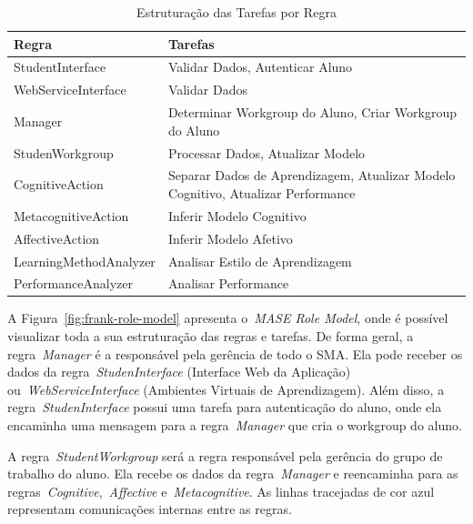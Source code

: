 \begin{table}
	\caption{Estruturação das Tarefas por Regra}
	\begin{tabular}{|p{5cm} | p{9cm}|}
		\hline
		\textbf{Regra}		& \textbf{Tarefas} \\
		\hline
		StudentInterface 	& Validar Dados, Autenticar Aluno  \\
		\hline
		WebServiceInterface 	& Validar Dados  \\
		\hline
		Manager 		& Determinar Workgroup do Aluno, Criar Workgroup do Aluno  \\ %
		\hline
		StudenWorkgroup 	& Processar Dados, Atualizar Modelo   \\
		\hline
		CognitiveAction 	& Separar Dados de Aprendizagem, Atualizar Modelo Cognitivo, Atualizar Performance  \\
		\hline
		MetacognitiveAction 	& Inferir Modelo Cognitivo  \\
		\hline
		AffectiveAction 	& Inferir Modelo Afetivo  \\
		\hline
		LearningMethodAnalyzer 	& Analisar Estilo de Aprendizagem  \\
		\hline
		PerformanceAnalyzer 	& Analisar Performance  \\
		\hline
	\end{tabular}
	\label{tabela:mase-role-model}
\end{table}

A Figura~\ref{fig:frank-role-model} apresenta o~\emph{MASE Role Model}, onde é possível visualizar toda a sua estruturação das regras e tarefas. De forma geral, a regra~\emph{Manager} é a responsável pela gerência de todo o SMA. Ela pode receber os dados da regra~\emph{StudenInterface} (Interface Web da Aplicação) ou~\emph{WebServiceInterface} (Ambientes Virtuais de Aprendizagem). Além disso, a regra~\emph{StudenInterface} possui uma tarefa para autenticação do aluno, onde ela encaminha uma mensagem para a regra~\emph{Manager} que cria o workgroup do aluno.

A regra~\emph{StudentWorkgroup} será a regra responsável pela gerência do grupo de trabalho do aluno. Ela recebe os dados da regra~\emph{Manager} e reencaminha para as regras~\emph{Cognitive},~\emph{Affective} e~\emph{Metacognitive}. As linhas tracejadas de cor azul representam comunicações internas entre as regras.

